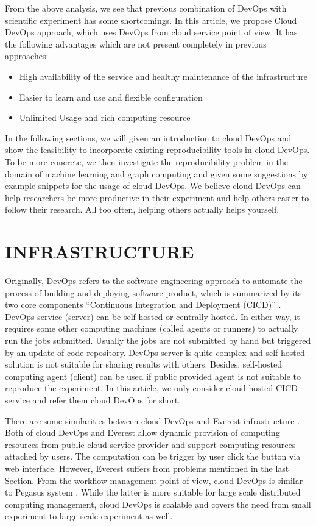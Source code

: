 \documentclass{IEEEcsmag}
\begin{document}
From the above analysis, we see that previous combination of DevOps with scientific experiment has some shortcomings. In this article, we propose Cloud DevOps approach, which uses DevOps from cloud service point of view. It has the following advantages which are not present completely in previous approaches:
\begin{itemize}
	\item High availability of the service and healthy maintenance of the infrastructure
	\item Easier to learn and use and flexible configuration 
	\item Unlimited Usage and rich computing resource
\end{itemize}
 In the following sections, we will given an introduction to cloud DevOps and show the feasibility to incorporate existing reproducibility tools in cloud DevOps. To be more concrete, we then investigate the reproducibility problem in the domain of machine learning and graph computing and  given some suggestions by example snippets for the usage of cloud DevOps. We believe cloud DevOps can help researchers be more productive in their experiment and help others easier to follow their research. All too often, helping others actually helps yourself.

\section{INFRASTRUCTURE}
Originally, DevOps refers to the software engineering approach to automate the process of building and deploying software product, which is summarized by its two core components ``Continuous Integration and Deployment (CICD)'' \cite{bass2015devops}. 
DevOps service (server) can be self-hosted or centrally hosted. In either way, it requires some other computing machines (called agents or runners) to actually run the jobs submitted. Usually the jobs are not submitted by hand but triggered by an update of code repository. 
DevOps server is quite complex and self-hosted solution is not suitable for sharing results with others. Besides, self-hosted computing agent (client) can be used if public provided agent is not suitable to reproduce the experiment. In this article, we only consider cloud hosted CICD service and refer them cloud DevOps for short.

There are some similarities between cloud DevOps and Everest infrastructure \cite{GavishD12} . Both of cloud DevOps and Everest allow dynamic provision of computing resources from public cloud service provider and support computing resources attached by users. The computation can be trigger by user click the button via web interface.
However, Everest suffers from problems mentioned in the last Section. From the workflow management point of view, cloud DevOps is similar to Pegasus system \cite{Pegasus}. While the latter is more suitable for large scale distributed computing management, cloud DevOps is scalable and covers the need from small experiment to large scale experiment as well.
\end{document}
